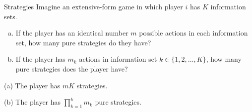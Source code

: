 \documentclass[10pt]{extarticle}
\title{}
\author{Avinash Iyer}
\date{}
\begin{document}
  \begin{problem}{Strategies}
    Imagine an extensive-form game in which player $i$ has $K$ information sets.
    \begin{enumerate}[(a)]
      \item If the player has an identical number $m$ possible actions in each information set, how many pure strategies do they have?
      \item If the player has $m_k$ actions in information set $k\in \{1,2,\dots,K\}$, how many pure strategies does the player have?
    \end{enumerate}
    \tcblower
    \begin{problem}{(a)}
      The player has $mK$ strategies.
    \end{problem}
    \begin{problem}{(b)}
      The player has $\prod_{k=1}^{k}m_k$ pure strategies.
    \end{problem}
  \end{problem}
\end{document}
